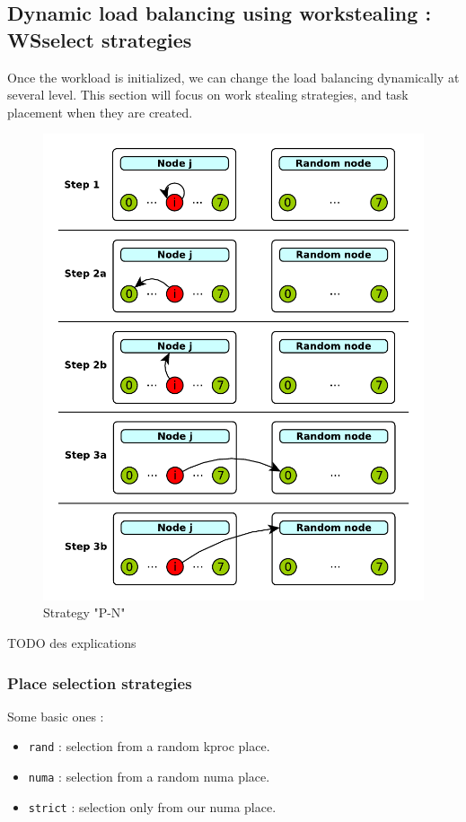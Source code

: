 \documentclass{Styles/llncs}
\begin{document}
\subsection{Dynamic load balancing using workstealing : WSselect strategies}

Once the workload is initialized, we can change the load balancing dynamically
at several level. This section will focus on work stealing strategies, and
task placement when they are created.

\begin{figure}[t]
  \centering
  \includegraphics[scale=0.8]{figures/strategies.pdf}
\caption{Strategy "P-N"}
\label{fig:detail-strategy}
\end{figure}

TODO des explications
\subsubsection{Place selection strategies}
Some basic ones :
\begin{itemize}
  \item \verb/rand/ : selection from a random kproc place.
  \item \verb/numa/ : selection from a random numa place.
  \item \verb/strict/ : selection only from our numa place.
\end{itemize}
\end{document}
